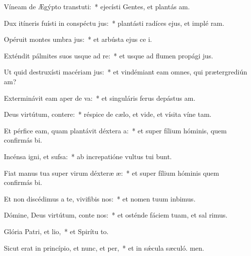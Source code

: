 \item Víneam de Ægýpto transtuti:~* ejecísti Gentes, et plantás am.
\item Dux itíneris fuísti in conspéctu jus:~* plantásti radíces ejus, et implé ram.
\item Opéruit montes umbra jus:~* et arbústa ejus ce i.
\item Exténdit pálmites suos usque ad re:~* et usque ad flumen propági jus.
\item Ut quid destruxísti macériam jus:~* et vindémiant eam omnes, qui prætergrediún am?
\item Exterminávit eam aper de va:~* et singuláris ferus depástus  am.
\item Deus virtútum, contere:~* réspice de cælo, et vide, et vísita víne tam.
\item Et pérfice eam, quam plantávit déxtera a:~* et super fílium hóminis, quem confirmás bi.
\item Incénsa igni, et sufsa:~* ab increpatióne vultus tui bunt.
\item Fiat manus tua super virum déxteræ æ:~* et super fílium hóminis quem confirmás bi.
\item Et non discédimus a te, vivifibis nos:~* et nomen tuum inbimus.
\item Dómine, Deus virtútum, conte nos:~* et osténde fáciem tuam, et sal rimus.
\item Glória Patri, et lio,~* et Spirítu to.
\item Sicut erat in princípio, et nunc, et per,~* et in sǽcula sæculó. men.
